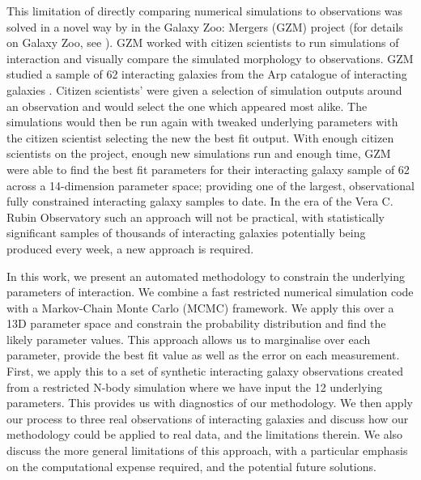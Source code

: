 This limitation of directly comparing numerical simulations to observations was solved in a novel way by \citet{2016MNRAS.459..720H} in the Galaxy Zoo: Mergers (GZM) project (for details on Galaxy Zoo, see \citet{2008MNRAS.389.1179L}). GZM worked with citizen scientists to run simulations of interaction and visually compare the simulated morphology to observations. GZM studied a sample of 62 interacting galaxies from the Arp catalogue of interacting galaxies \citep{1966ApJS...14....1A}. Citizen scientists' were given a selection of simulation outputs around an observation and would select the one which appeared most alike. The simulations would then be run again with tweaked underlying parameters with the citizen scientist selecting the new the best fit output. With enough citizen scientists on the project, enough new simulations run and enough time, GZM were able to find the best fit parameters for their interacting galaxy sample of 62 across a 14-dimension parameter space; providing one of the largest, observational fully constrained interacting galaxy samples to date. In the era of the Vera C. Rubin Observatory such an approach will not be practical, with statistically significant samples of thousands of interacting galaxies potentially being produced every week, a new approach is required.

In this work, we present an automated methodology to constrain the underlying parameters of interaction. We combine a fast restricted numerical simulation code with a Markov-Chain Monte Carlo (MCMC) framework. We apply this over a 13D parameter space and constrain the probability distribution and find the likely parameter values. This approach allows us to marginalise over each parameter, provide the best fit value as well as the error on each measurement. First, we apply this to a set of synthetic interacting galaxy observations created from a restricted N-body simulation where we have input the 12 underlying parameters. This provides us with diagnostics of our methodology. We then apply our process to three real observations of interacting galaxies and discuss how our methodology could be applied to real data, and the limitations therein. We also discuss the more general limitations of this approach, with a particular emphasis on the computational expense required, and the potential future solutions.

